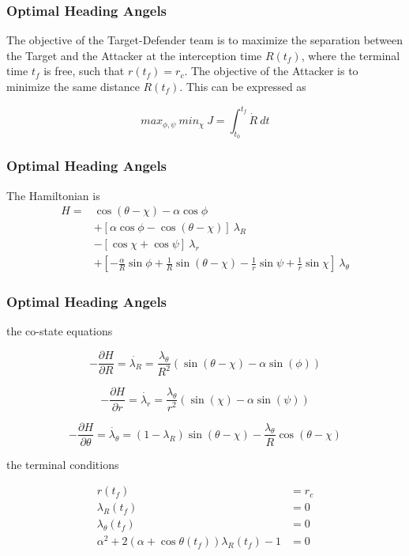 \documentclass{beamer}
\begin{document}
\begin{frame}
\frametitle{Optimal Heading Angels}
The objective of the Target-Defender team is to maximize
the separation between the Target and the Attacker at the
interception time $R(t_f)$, where the terminal time $t_f$ is free,
such that $r(t_f) = r_c$. The objective of the Attacker is to
minimize the same distance $R(t_f)$. This can be expressed as

\begin{equation*}
max_{\phi,\psi}\ min_\chi\ J= \int_{t_0}^{t_f} \dot{R}\ dt
\end{equation*}
\end{frame}
\begin{frame}
\frametitle{Optimal Heading Angels}
The Hamiltonian is
\begin{equation}
\begin{split}
H = & \cos(\theta - \chi) - \alpha \cos \phi \\
& + [\alpha \cos \phi  - \cos (\theta - \chi)]\ \lambda_R \\
& - [\cos\chi + \cos\psi]\ \lambda_r \\
& + [-\frac{\alpha}{R}\sin\phi 
+\frac{1}{R}\sin(\theta - \chi )
-\frac{1}{r} \sin \psi
+\frac{1}{r} \sin \chi]\ \lambda_\theta
\end{split}
\label{Hamiltonian}
\end{equation}
\end{frame}
\begin{frame}
\frametitle{Optimal Heading Angels}
the co-state equations

\begin{equation}
-\frac{\partial H}{\partial R} = \dot{\lambda_R}=\frac{\lambda_\theta}{R^2} (\sin(\theta - \chi) -\alpha \sin(\phi) )
\label{lambda R dot}
\end{equation}


\begin{equation}
-\frac{\partial H}{\partial r} = \dot{\lambda_r}=\frac{\lambda_\theta}{r^2} (\sin(\chi) -\alpha \sin(\psi) )
\label{lambda r dot}
\end{equation}

\begin{equation}
-\frac{\partial H}{\partial \theta} = \dot{\lambda_\theta}=(1- \lambda_R) \sin(\theta - \chi) - \frac{\lambda_\theta}{R} \cos(\theta - \chi)
\label{lambda theta dot}
\end{equation}


the terminal conditions 

\begin{equation}
\begin{split}
r(t_f)&=r_c\\
\lambda_R(t_f)&=0\\
\lambda_\theta(t_f)&=0\\
\alpha^2 + 2(\alpha + \cos\theta(t_f)) \lambda_R(t_f)-1&=0
\end{split}
\label{terminal conditions}
\end{equation}
\end{frame}
\end{document}
